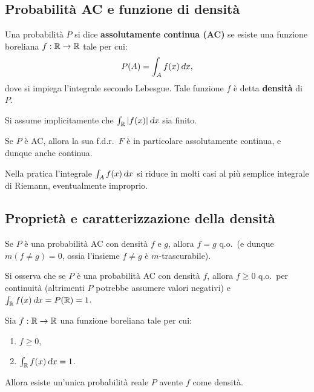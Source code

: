 \begin{multicols*}{2}
\subsection{Probabilità AC e funzione di densità}

\begin{definition}
    Una probabilità $P$ si dice \textbf{assolutamente continua (AC)}
    se esiste una funzione
    boreliana $f : \mathbb{R} \to \mathbb{R}$ tale per cui:
    \[
        P(A) = \int_A f(x) \dx,
    \]
    dove si impiega l'integrale secondo Lebesgue. Tale funzione $f$ è
    detta \textbf{densità} di $P$. \smallskip


    Si assume implicitamente che $\int_\RR \abs{f(x)} \dx$ sia finito.
\end{definition}

\begin{remark}
    Se $P$ è AC, allora la sua f.d.r.~$F$ è in particolare
    assolutamente continua, e dunque anche continua.
\end{remark}

\begin{remark}
    Nella pratica l'integrale $\int_A f(x) \dx$ si riduce in molti casi
    al più semplice integrale di Riemann, eventualmente improprio.
\end{remark}

\subsection{Proprietà e caratterizzazione della densità}

\begin{proposition}
    Se $P$ è una probabilità AC con densità $f$ e $g$, allora
    $f = g$ q.o.~(e dunque $m(f \neq g) = 0$, ossia l'insieme
    $f \neq g$ è $m$-trascurabile).
\end{proposition}

\begin{remark}
    Si osserva che se $P$ è una probabilità AC con densità
    $f$, allora $f \geq 0$ q.o.~per continuità (altrimenti $P$ potrebbe
    assumere valori negativi) e $\int_\RR f(x) \dx = P(\RR) = 1$.
\end{remark}

\begin{proposition}
    Sia $f : \mathbb{R} \to \mathbb{R}$ una funzione boreliana tale per cui:
    \begin{enumerate}[(i.)]
        \item $f \geq 0$,
        \item $\int_\RR f(x) \dx = 1$.
    \end{enumerate}
    Allora esiste un'unica probabilità reale $P$ avente $f$ come densità.
\end{proposition}


\end{multicols*}
